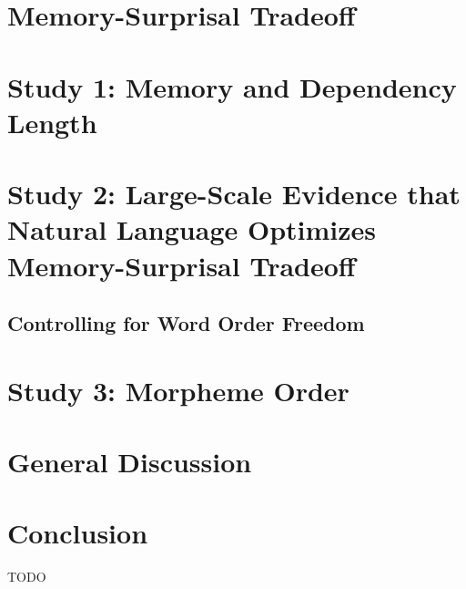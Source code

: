 \documentclass[11pt,letterpaper]{article}
\begin{document}



\section{Memory-Surprisal Tradeoff}\label{sec:ms-tradeoff}



\section{Study 1: Memory and Dependency Length}



%


\section{Study 2: Large-Scale Evidence that Natural Language Optimizes Memory-Surprisal Tradeoff}
\label{sec:main-experiment}



\subsection{Controlling for Word Order Freedom}\label{subsec:freedom}



\section{Study 3: Morpheme Order}




\section{General Discussion}




\section{Conclusion}

TODO




\end{document}
